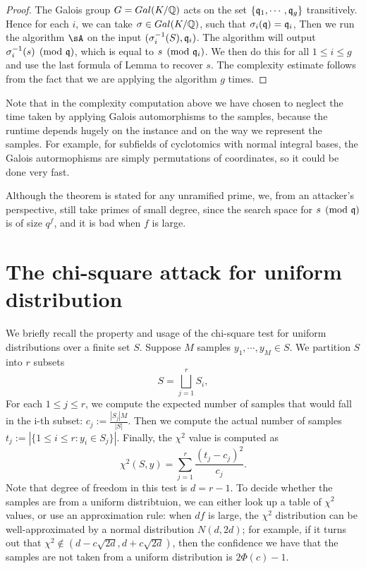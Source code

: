 \documentclass{amsart}
\begin{document}
\begin{proof}
The Galois group $G =Gal(K/\mathbb{Q})$ acts on the set $\{\mathfrak{q}_1, \cdots ,\mathfrak{q}_g\}$ transitively. Hence for each $i$, we can take $\sigma \in Gal(K/\mathbb{Q})$, such that $\sigma_i(\mathfrak{q}) = \mathfrak{q}_i$, Then we run the algorithm $\sA$ on the input $(\sigma_i^{-1}(S), \mathfrak{q}_i)$. The algorithm will output $\sigma_i^{-1}(s) \pmod{\mathfrak{q}}$, which is equal to $s \pmod{\mathfrak{q}_i}$. We then do this for all $1\leq i \leq g$ and use the last formula of Lemma to recover $s$. The complexity estimate follows from the fact that we are applying the algorithm $g$ times.
\end{proof}

\begin{remark}
Note that in the complexity computation above we have chosen to neglect the time taken by applying Galois automorphisms to the samples, because the runtime depends
hugely on the instance and on the way we represent the samples. For example, for subfields of cyclotomics with normal integral bases, the Galois autormophisms are simply permutations of coordinates, so it could be done very fast.
\end{remark}

\begin{remark}
Although the theorem is stated for any unramified prime, we, from an attacker's perspective, still take primes of small degree, since the search space for $s \pmod{\mathfrak{q}}$ is of size $q^f$, and it is bad when $f$ is large.
\end{remark}

\section{The chi-square attack for uniform distribution}
\label{sec: chi-square}
We briefly recall the property and usage of the chi-square test for uniform distributions over a finite set $S$. Suppose  $M$ samples $y_1, \cdots, y_M \in S$. We partition $S$ into $r$ subsets
\[
    S = \bigsqcup_{j=1}^r S_i,
\]
For each $1 \leq j \leq r$, we compute the expected number of samples that would fall in the i-th subset: $c_j := \frac{|S_j|M}{|S|}$. Then we compute the actual number of samples $t_j := |\{1 \leq i \leq r: y_i \in S_j\}|$. Finally, the $\chi^2$ value is computed as
\[
    \chi^2(S,y) = \sum_{j = 1}^r \frac{(t_j -c_j)^2}{c_j}.
\]
Note that degree of freedom in this test is $d = r-1$.
To decide whether the samples are from a uniform distribtuion, we can either look up a table of $\chi^2$ values, or use an approximation rule:  when $df$ is large, the $\chi^2$ distribution can be well-approximated by a normal distribution $N(d, 2d)$; for example, if it turns out that $\chi^2 \notin (d - c \sqrt{2d}, d+ c \sqrt{2d})$, then the confidence we have that the samples are not taken from a uniform distribution is $2\Phi(c) - 1$.
\end{document}
